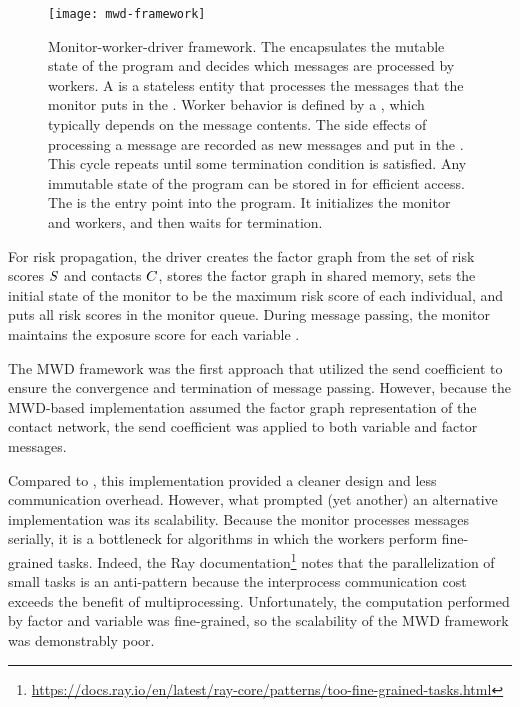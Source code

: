 \begin{figure}[htbp]
\centering
\texttt{[image: mwd-framework]}
\caption[Monitor-worker-driver framework]{Monitor-worker-driver framework. The  encapsulates the mutable state of the program and decides which messages are processed by workers. A  is a stateless entity that processes the messages that the monitor puts in the . Worker behavior is defined by a , which typically depends on the message contents. The side effects of processing a message are recorded as new messages and put in the . This cycle repeats until some termination condition is satisfied. Any immutable state of the program can be stored in  for efficient access. The  is the entry point into the program. It initializes the monitor and workers, and then waits for termination.}
\label{fig:mwd-framework}
\end{figure}

For risk propagation, the driver creates the factor graph from the set of risk scores $S$ and contacts $C$, stores the factor graph in shared memory, sets the initial state of the monitor to be the maximum risk score of each individual, and puts all risk scores in the monitor queue. During message passing, the monitor maintains the exposure score for each variable \vertexName.

The MWD framework was the first approach that utilized the send coefficient to ensure the convergence and termination of message passing. However, because the MWD-based implementation assumed the factor graph representation of the contact network, the send coefficient was applied to both variable and factor messages.

Compared to , this implementation provided a cleaner design and less communication overhead. However, what prompted (yet another) an alternative implementation was its scalability. Because the monitor processes messages serially, it is a bottleneck for algorithms in which the workers perform fine-grained tasks. Indeed, the Ray documentation\footnote{\url{https://docs.ray.io/en/latest/ray-core/patterns/too-fine-grained-tasks.html}} notes that the parallelization of small tasks is an anti-pattern because the interprocess communication cost exceeds the benefit of multiprocessing. Unfortunately, the computation performed by factor \verticesName and variable \verticesName was fine-grained, so the scalability of the MWD framework was demonstrably poor.

